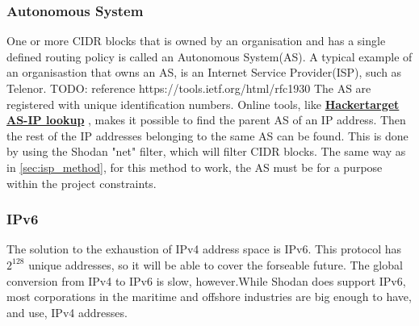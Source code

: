 \subsubsection{Autonomous System}
One or more CIDR blocks that is owned by an organisation and has a single defined routing policy is called an Autonomous System(AS). A typical example of an organisastion that owns an AS, is an Internet Service Provider(ISP), such as Telenor. TODO: reference https://tools.ietf.org/html/rfc1930
The AS are registered with unique identification numbers. Online tools, like \href{https://hackertarget.com/as-ip-lookup/}{\textbf{Hackertarget AS-IP lookup}} \cite{asip_lookup}, makes it possible to find the parent AS of an IP address. Then the rest of the IP addresses belonging to the same AS can be found. This is done by using the Shodan "net" filter, which will filter CIDR blocks. The same way as in \cref{sec:isp_method}, for this method to work, the AS must be for a purpose within the project constraints.

\subsubsection{IPv6}
The solution to the exhaustion of IPv4 address space is IPv6. This protocol has $2^{128}$ unique addresses, so it will be able to cover the forseable future. The global conversion from IPv4 to IPv6 is slow, however.While Shodan does support IPv6, most corporations in the maritime and offshore industries are big enough to have, and use, IPv4 addresses. 



